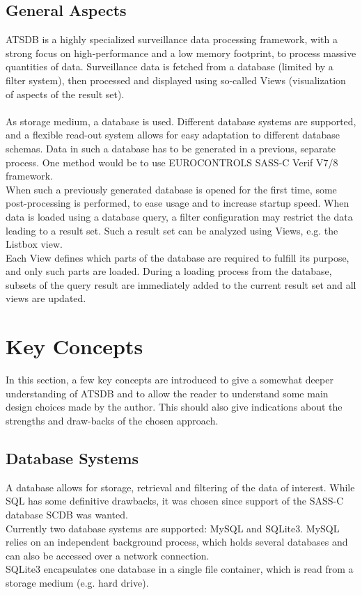 \documentclass[10pt,letterpaper,extrafontsizes]{memoir}
\begin{document}
\section{General Aspects}
ATSDB is a highly specialized surveillance data processing framework, with a strong focus on high-performance and  a  low  memory  footprint,  to  process  massive  quantities  of  data.   Surveillance  data  is fetched from a database (limited by a filter system), then processed and displayed using so-called Views (visualization of aspects of the result set).\\\\

As storage medium, a database is used.  Different database systems are supported, and a flexible read-out system allows for easy adaptation to different database schemas.  Data in such a database has to be generated in a previous, separate process.  One method would be to use EUROCONTROLS SASS-C  Verif V7/8 framework.\\

When such a previously generated database is opened for the first time, some post-processing is performed, to ease usage and to increase startup speed.  When data is loaded using a database query, a filter configuration may restrict the data leading to a result set.  Such a result set can be analyzed using Views, e.g. the Listbox view.\\

Each View defines which parts of the database are required to fulfill its purpose, and only such parts are loaded.  During a loading process from the database, subsets of the query result are immediately added to the current result set and all views are updated.

\chapter{Key Concepts}
\label{cha:key_concepts}

In this section, a few key concepts are introduced to give a somewhat deeper understanding of ATSDB and to allow the reader to understand some main design choices made by the author. This should also give indications about the strengths and draw-backs of the chosen approach.

\section*{Database Systems}
A database allows for storage, retrieval and filtering of the data of interest. While SQL has some definitive drawbacks, it was chosen since support of the SASS-C database SCDB was wanted.\\
Currently  two  database  systems  are  supported:  MySQL  and  SQLite3.   MySQL  relies  on  an  independent background process, which holds several databases and can also be accessed over a network connection.\\
SQLite3 encapsulates one database in a single file container, which is read from a storage medium (e.g. hard drive).
\end{document}
